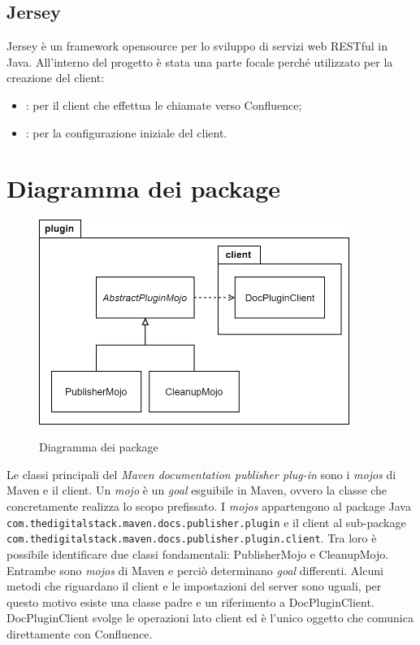 \subsection{Jersey} %
Jersey è un framework opensource per lo sviluppo di servizi web RESTful in Java.
All'interno del progetto è stata una parte focale perché utilizzato per la creazione del client:
\begin{itemize}
    \item {}: per il client che effettua le chiamate verso Confluence;
    \item {}: per la configurazione iniziale del client.
\end{itemize}

\clearpage

\section{Diagramma dei package}
\label{sec:diagramma-package}
\begin{figure}[H]
    \centering
    \includegraphics[width=0.9\textwidth]{immagini/PackageDiagram.png}\\
    \caption{Diagramma dei package}
\end{figure}
Le classi principali del \emph{Maven documentation publisher plug-in} sono i \emph{mojos} di Maven e il client.
Un \emph{mojo} è un \emph{goal} esguibile in Maven, ovvero la classe che concretamente realizza lo scopo prefissato.
I \emph{mojos} appartengono al package Java \texttt{com.thedigitalstack.maven.docs.publisher.plugin} e il client al sub-package\\ \texttt{com.thedigitalstack.maven.docs.publisher.plugin.client}.
Tra loro è possibile identificare due classi fondamentali: PublisherMojo e CleanupMojo.
Entrambe sono \emph{mojos} di Maven e perciò determinano \emph{goal} differenti.
Alcuni metodi che riguardano il client e le impostazioni del server sono uguali, per questo motivo esiste una classe padre e un riferimento a DocPluginClient.
DocPluginClient svolge le operazioni lato client ed è l'unico oggetto che comunica direttamente con Confluence.

